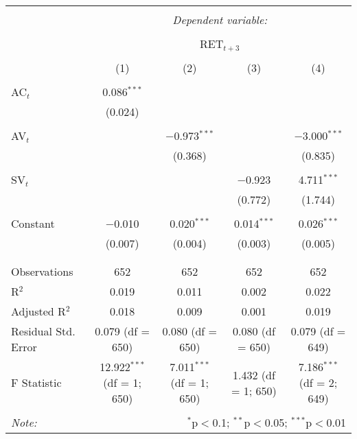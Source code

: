 
\begin{table}[!htbp] \centering 
  \caption{} 
  \label{} 
\begin{tabular}{@{\extracolsep{5pt}}lcccc} 
\\[-1.8ex]\hline 
\hline \\[-1.8ex] 
 & \multicolumn{4}{c}{\textit{Dependent variable:}} \\ 
\cline{2-5} 
\\[-1.8ex] & \multicolumn{4}{c}{RET$_{t+3}$} \\ 
\\[-1.8ex] & (1) & (2) & (3) & (4)\\ 
\hline \\[-1.8ex] 
 AC$_{t}$ & 0.086$^{***}$ &  &  &  \\ 
  & (0.024) &  &  &  \\ 
  & & & & \\ 
 AV$_{t}$ &  & $-$0.973$^{***}$ &  & $-$3.000$^{***}$ \\ 
  &  & (0.368) &  & (0.835) \\ 
  & & & & \\ 
 SV$_{t}$ &  &  & $-$0.923 & 4.711$^{***}$ \\ 
  &  &  & (0.772) & (1.744) \\ 
  & & & & \\ 
 Constant & $-$0.010 & 0.020$^{***}$ & 0.014$^{***}$ & 0.026$^{***}$ \\ 
  & (0.007) & (0.004) & (0.003) & (0.005) \\ 
  & & & & \\ 
\hline \\[-1.8ex] 
Observations & 652 & 652 & 652 & 652 \\ 
R$^{2}$ & 0.019 & 0.011 & 0.002 & 0.022 \\ 
Adjusted R$^{2}$ & 0.018 & 0.009 & 0.001 & 0.019 \\ 
Residual Std. Error & 0.079 (df = 650) & 0.080 (df = 650) & 0.080 (df = 650) & 0.079 (df = 649) \\ 
F Statistic & 12.922$^{***}$ (df = 1; 650) & 7.011$^{***}$ (df = 1; 650) & 1.432 (df = 1; 650) & 7.186$^{***}$ (df = 2; 649) \\ 
\hline 
\hline \\[-1.8ex] 
\textit{Note:}  & \multicolumn{4}{r}{$^{*}$p$<$0.1; $^{**}$p$<$0.05; $^{***}$p$<$0.01} \\ 
\end{tabular} 
\end{table} 
